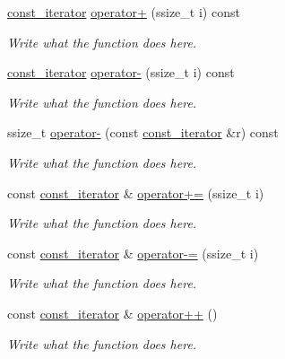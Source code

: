 \begin{DoxyCompactItemize}
\hyperlink{classMesh__t_1_1const__iterator}{const\+\_\+iterator} \hyperlink{classMesh__t_1_1const__iterator_aec122ec9ac2784f2bfb25edd9312486a}{operator+} (ssize\+\_\+t i) const 
\begin{DoxyCompactList}\small\item\em Write what the function does here. \end{DoxyCompactList}\item 
\hyperlink{classMesh__t_1_1const__iterator}{const\+\_\+iterator} \hyperlink{classMesh__t_1_1const__iterator_abb246af63c0fe9bda59bfbf3af590e43}{operator-\/} (ssize\+\_\+t i) const 
\begin{DoxyCompactList}\small\item\em Write what the function does here. \end{DoxyCompactList}\item 
ssize\+\_\+t \hyperlink{classMesh__t_1_1const__iterator_a1278d4a60a6ab8d6a1dfd0fd86ed2f5b}{operator-\/} (const \hyperlink{classMesh__t_1_1const__iterator}{const\+\_\+iterator} \&r) const 
\begin{DoxyCompactList}\small\item\em Write what the function does here. \end{DoxyCompactList}\item 
const \hyperlink{classMesh__t_1_1const__iterator}{const\+\_\+iterator} \& \hyperlink{classMesh__t_1_1const__iterator_a4cbe8dca9e1cbf5224de5acd0c130366}{operator+=} (ssize\+\_\+t i)
\begin{DoxyCompactList}\small\item\em Write what the function does here. \end{DoxyCompactList}\item 
const \hyperlink{classMesh__t_1_1const__iterator}{const\+\_\+iterator} \& \hyperlink{classMesh__t_1_1const__iterator_a2c01055aeeea1bba07f0303d7d89f5dc}{operator-\/=} (ssize\+\_\+t i)
\begin{DoxyCompactList}\small\item\em Write what the function does here. \end{DoxyCompactList}\item 
const \hyperlink{classMesh__t_1_1const__iterator}{const\+\_\+iterator} \& \hyperlink{classMesh__t_1_1const__iterator_a579d9d6186ddaba92c4f2d96f9783cd2}{operator++} ()
\begin{DoxyCompactList}\small\item\em Write what the function does here. \end{DoxyCompactList}\item 

\end{DoxyCompactItemize}
